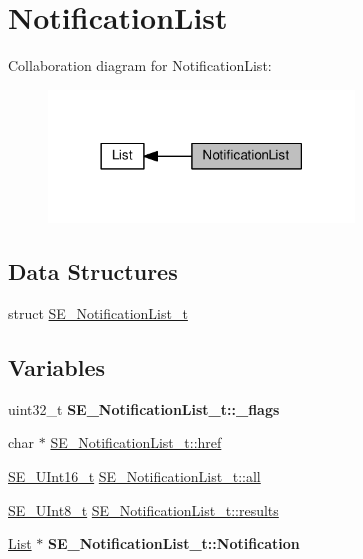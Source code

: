 \hypertarget{group__NotificationList}{}\section{Notification\+List}
\label{group__NotificationList}
Collaboration diagram for Notification\+List\+:\nopagebreak
\begin{figure}[H]
\begin{center}
\leavevmode
\includegraphics[width=230pt]{group__NotificationList}
\end{center}
\end{figure}
\subsection*{Data Structures}
\begin{DoxyCompactItemize}
\item 
struct \hyperlink{structSE__NotificationList__t}{S\+E\+\_\+\+Notification\+List\+\_\+t}
\end{DoxyCompactItemize}
\subsection*{Variables}
\begin{DoxyCompactItemize}
\item 
\mbox{\label{group__NotificationList_ga1562a2419abf1b794dcb37857015d36d}} 
uint32\+\_\+t {\bfseries S\+E\+\_\+\+Notification\+List\+\_\+t\+::\+\_\+flags}
\item 
char $\ast$ \hyperlink{group__NotificationList_ga04f41cbd1d96801ed0fed7c958e4b5b1}{S\+E\+\_\+\+Notification\+List\+\_\+t\+::href}
\item 
\hyperlink{group__UInt16_gac68d541f189538bfd30cfaa712d20d29}{S\+E\+\_\+\+U\+Int16\+\_\+t} \hyperlink{group__NotificationList_gacdc28bcbd39f7984a6ba52a731267bcc}{S\+E\+\_\+\+Notification\+List\+\_\+t\+::all}
\item 
\hyperlink{group__UInt8_gaf7c365a1acfe204e3a67c16ed44572f5}{S\+E\+\_\+\+U\+Int8\+\_\+t} \hyperlink{group__NotificationList_ga2a5654da4e99aa6515a308a702b7dee8}{S\+E\+\_\+\+Notification\+List\+\_\+t\+::results}
\item 
\mbox{\label{group__NotificationList_gaee115c0fcc73a3d5a3fe8f4118ffdc94}} 
\hyperlink{structList}{List} $\ast$ {\bfseries S\+E\+\_\+\+Notification\+List\+\_\+t\+::\+Notification}
\end{DoxyCompactItemize}


